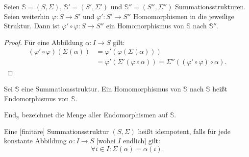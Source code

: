 \documentclass{article}
\begin{document}
\begin{theorem}
  Seien $\mathbb{S} = (S, \Sigma)$, $\mathbb{S}' = (S', \Sigma')$ und $\mathbb{S}'' = (S'', \Sigma'')$ Summationsstrukturen.
  Seien weiterhin $\varphi \colon S \to S'$ und $\varphi' \colon S' \to S''$ Homomorphismen in die jeweilige Struktur.
  Dann ist $\varphi' \circ \varphi \colon S \to S''$ ein Homomorphismus von $\mathbb{S}$ nach $\mathbb{S}''$.
\end{theorem}
\begin{proof}
  Für eine Abbildung $\alpha \colon I \to S$ gilt:
  \begin{align*}
    (\varphi' \circ \varphi)(\Sigma(\alpha)) &= \varphi'(\varphi(\Sigma(\alpha))) \\
    &= \varphi'(\Sigma'(\varphi \circ \alpha)) 
    = \Sigma''((\varphi' \circ \varphi) \circ \alpha).
  \end{align*}
\end{proof}

\begin{definition}
  Sei $\mathbb{S}$ eine Summationsstruktur. 
  Ein Homomorphismus von $\mathbb{S}$ nach $\mathbb{S}$ heißt Endomorphismus von $\mathbb{S}$.

  $\text{End}_\mathbb{S}$ bezeichnet die Menge aller Endomorphismen auf $\mathbb{S}$.
\end{definition}

\begin{definition}
  Eine [finitäre] Summationsstruktur $(S, \Sigma)$ heißt idempotent, falls für jede konstante Abbildung
  $\alpha \colon I \to S$ [wobei $I$ endlich] gilt:
  \begin{equation*}
    \forall i \in I \colon \Sigma(\alpha) = \alpha(i).
  \end{equation*}
\end{definition}
\end{document}
